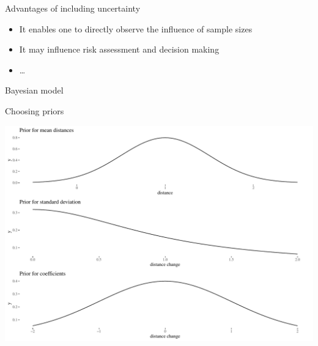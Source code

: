\documentclass[
  10pt,
  ignorenonframetext,
  x11names, dvipsnames, bibspacing,natbib]{beamer}
\providecommand{\tightlist}{%
  \setlength{\itemsep}{0pt}\setlength{\parskip}{0pt}}
\begin{document}
\begin{frame}{Advantages of including uncertainty}
\protect\hypertarget{advantages-of-including-uncertainty}{}
\begin{itemize}
\tightlist
\item
  It enables one to directly observe the influence of sample sizes
\item
  It may influence risk assessment and decision making
\item
  \ldots{}
\end{itemize}
\end{frame}

\begin{frame}{Bayesian model}
\protect\hypertarget{bayesian-model}{}
\begin{block}{Choosing priors}
\protect\hypertarget{choosing-priors}{}
\begin{center}\includegraphics[width=1\linewidth]{presentationESSLLI_files/figure-beamer/priorsVis-1} \end{center}
\end{block}
\end{frame}
\end{document}
